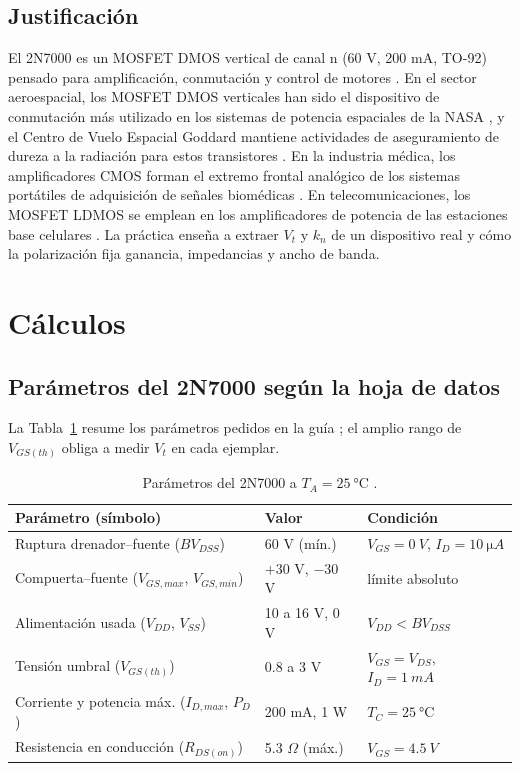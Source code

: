 \documentclass[conference]{IEEEtran}
\newcommand{\kn}{k_n}
\begin{document}
\subsection{Justificación}
El 2N7000 es un MOSFET DMOS vertical de canal n (60 V, 200 mA, TO-92) pensado para amplificación, conmutación y control de motores \cite{datasheet}. En el sector aeroespacial, los MOSFET DMOS verticales han sido el dispositivo de conmutación más utilizado en los sistemas de potencia espaciales de la NASA \cite{shea}, y el Centro de Vuelo Espacial Goddard mantiene actividades de aseguramiento de dureza a la radiación para estos transistores \cite{lauenstein}. En la industria médica, los amplificadores CMOS forman el extremo frontal analógico de los sistemas portátiles de adquisición de señales biomédicas \cite{kao}. En telecomunicaciones, los MOSFET LDMOS se emplean en los amplificadores de potencia de las estaciones base celulares \cite{litwin}. La práctica enseña a extraer $V_t$ y $\kn$ de un dispositivo real y cómo la polarización fija ganancia, impedancias y ancho de banda.

\section{Cálculos}

\subsection{Parámetros del 2N7000 según la hoja de datos}
La Tabla~\ref{tab:datasheet} resume los parámetros pedidos en la guía \cite{datasheet}; el amplio rango de $V_{GS(th)}$ obliga a medir $V_t$ en cada ejemplar.

\begin{table}[htbp]
\centering
\caption{Parámetros del 2N7000 a $T_A=\SI{25}{\celsius}$ \cite{datasheet}.}
\label{tab:datasheet}
\scriptsize
\renewcommand{\arraystretch}{1.05}
\begin{tabular}{@{}lll@{}}
\toprule
Parámetro (símbolo) & Valor & Condición \\
\midrule
Ruptura drenador--fuente ($BV_{DSS}$) & 60 V (mín.) & $V_{GS}=\SI{0}{V}$, $I_D=\SI{10}{\micro A}$ \\
Compuerta--fuente ($V_{GS,max}$, $V_{GS,min}$) & $+30$ V, $-30$ V & límite absoluto \\
Alimentación usada ($V_{DD}$, $V_{SS}$) & 10 a 16 V, 0 V & $V_{DD}<BV_{DSS}$ \\
Tensión umbral ($V_{GS(th)}$) & 0.8 a 3 V & $V_{GS}=V_{DS}$, $I_D=\SI{1}{mA}$ \\
Corriente y potencia máx. ($I_{D,max}$, $P_D$) & 200 mA, 1 W & $T_C=\SI{25}{\celsius}$ \\
Resistencia en conducción ($R_{DS(on)}$) & 5.3 $\Omega$ (máx.) & $V_{GS}=\SI{4.5}{V}$ \\
\bottomrule
\end{tabular}
\end{table}
\end{document}
